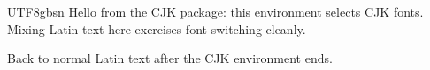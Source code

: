 \documentclass{article}
\begin{document}
\begin{CJK*}{UTF8}{gbsn}
Hello from the CJK package: this environment selects CJK fonts.
Mixing Latin text here exercises font switching cleanly.
\end{CJK*}
Back to normal Latin text after the CJK environment ends.
\end{document}
